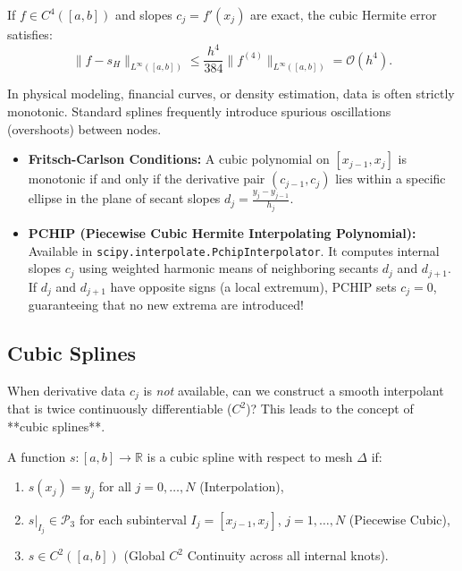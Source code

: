 \begin{theorem}
    If $f \in C^4([a, b])$ and slopes $c_j = f'(x_j)$ are exact, the cubic Hermite error satisfies:
    \begin{equation}
        \|f - s_H\|_{L^\infty([a, b])} \le \frac{h^4}{384} \|f^{(4)}\|_{L^\infty([a, b])} = \mathcal{O}(h^4).
    \end{equation}
\end{theorem}

\begin{important}
    In physical modeling, financial curves, or density estimation, data is often strictly monotonic. Standard splines frequently introduce spurious oscillations (overshoots) between nodes.
    \begin{itemize}
        \item \textbf{Fritsch-Carlson Conditions:} A cubic polynomial on $[x_{j-1}, x_j]$ is monotonic if and only if the derivative pair $(c_{j-1}, c_j)$ lies within a specific ellipse in the plane of secant slopes $d_j = \frac{y_j - y_{j-1}}{h_j}$.
        \item \textbf{PCHIP (Piecewise Cubic Hermite Interpolating Polynomial):} Available in \texttt{scipy.interpolate.PchipInterpolator}. It computes internal slopes $c_j$ using weighted harmonic means of neighboring secants $d_j$ and $d_{j+1}$. If $d_j$ and $d_{j+1}$ have opposite signs (a local extremum), PCHIP sets $c_j = 0$, guaranteeing that no new extrema are introduced!
    \end{itemize}
\end{important}

\subsection{Cubic Splines}

When derivative data $c_j$ is \textit{not} available, can we construct a smooth interpolant that is twice continuously differentiable ($C^2$)? This leads to the concept of **cubic splines**.

\begin{definition}
    A function $s: [a, b] \to \mathbb{R}$ is a cubic spline with respect to mesh $\Delta$ if:
    \begin{enumerate}
        \item $s(x_j) = y_j$ for all $j = 0, \dots, N$ (Interpolation),
        \item $s|_{I_j} \in \mathcal{P}_3$ for each subinterval $I_j = [x_{j-1}, x_j]$, $j = 1, \dots, N$ (Piecewise Cubic),
        \item $s \in C^2([a, b])$ (Global $C^2$ Continuity across all internal knots).
    \end{enumerate}
\end{definition}

